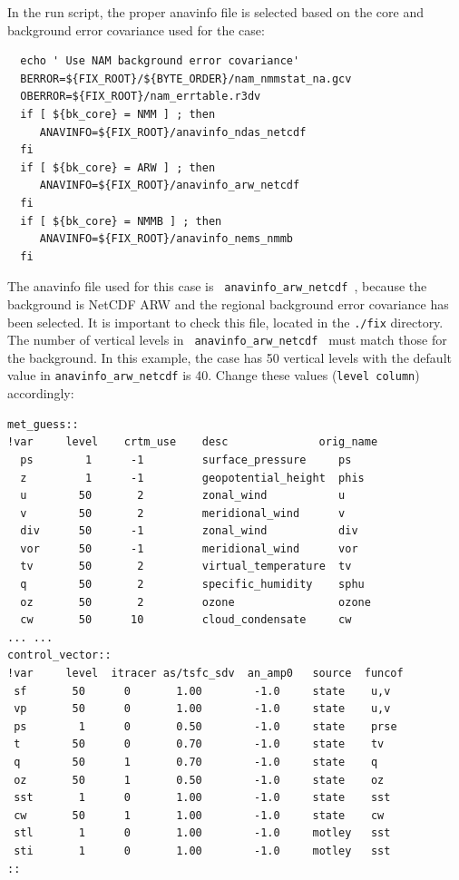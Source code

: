 In the run script, the proper anavinfo file is selected based on the core and background error covariance used for the case:

\begin{footnotesize}
\begin{verbatim}
  echo ' Use NAM background error covariance'
  BERROR=${FIX_ROOT}/${BYTE_ORDER}/nam_nmmstat_na.gcv
  OBERROR=${FIX_ROOT}/nam_errtable.r3dv
  if [ ${bk_core} = NMM ] ; then
     ANAVINFO=${FIX_ROOT}/anavinfo_ndas_netcdf
  fi
  if [ ${bk_core} = ARW ] ; then
     ANAVINFO=${FIX_ROOT}/anavinfo_arw_netcdf
  fi
  if [ ${bk_core} = NMMB ] ; then
     ANAVINFO=${FIX_ROOT}/anavinfo_nems_nmmb
  fi
\end{verbatim}
\end{footnotesize}

The anavinfo file used for this case is \verb| anavinfo_arw_netcdf |, because the background is NetCDF ARW and the regional background error covariance has been selected. It is
important to check this file, located in the \verb|./fix| directory. The number of vertical levels in  \verb| anavinfo_arw_netcdf | must match those for the background. In this example, the case has 50 vertical levels with the default value in \verb|anavinfo_arw_netcdf| is 40. Change these values (\verb|level column|) accordingly:

\begin{footnotesize}
\begin{verbatim}
met_guess::
!var     level    crtm_use    desc              orig_name
  ps        1      -1         surface_pressure     ps
  z         1      -1         geopotential_height  phis
  u        50       2         zonal_wind           u
  v        50       2         meridional_wind      v
  div      50      -1         zonal_wind           div
  vor      50      -1         meridional_wind      vor
  tv       50       2         virtual_temperature  tv
  q        50       2         specific_humidity    sphu
  oz       50       2         ozone                ozone
  cw       50      10         cloud_condensate     cw
... ...
control_vector::
!var     level  itracer as/tsfc_sdv  an_amp0   source  funcof
 sf       50      0       1.00        -1.0     state    u,v
 vp       50      0       1.00        -1.0     state    u,v
 ps        1      0       0.50        -1.0     state    prse
 t        50      0       0.70        -1.0     state    tv
 q        50      1       0.70        -1.0     state    q
 oz       50      1       0.50        -1.0     state    oz
 sst       1      0       1.00        -1.0     state    sst
 cw       50      1       1.00        -1.0     state    cw
 stl       1      0       1.00        -1.0     motley   sst
 sti       1      0       1.00        -1.0     motley   sst
::
\end{verbatim}
\end{footnotesize}

